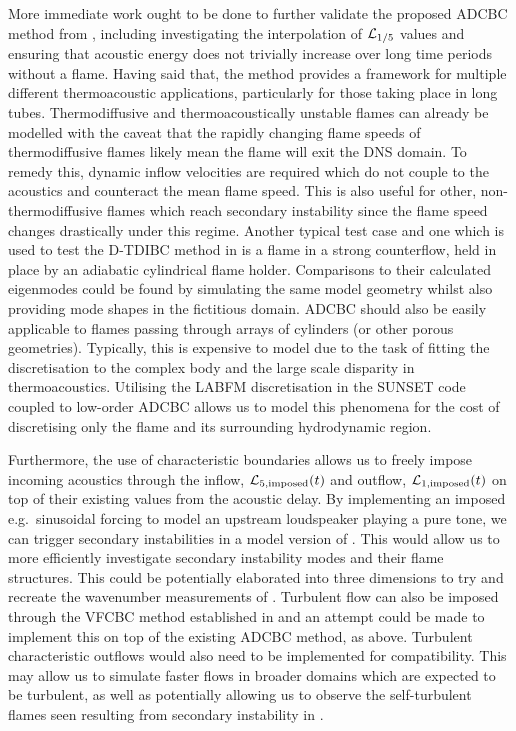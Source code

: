 More immediate work ought to be done to further validate the proposed ADCBC method from , including investigating the interpolation of $\mathcal{L}_{1/5}$ values and ensuring that acoustic energy does not trivially increase over long time periods without a flame. Having said that, the method provides a framework for multiple different thermoacoustic applications, particularly for those taking place in long tubes. Thermodiffusive and thermoacoustically unstable flames can already be modelled with the caveat that the rapidly changing flame speeds of thermodiffusive flames likely mean the flame will exit the DNS domain. To remedy this, dynamic inflow velocities are required which do not couple to the acoustics and counteract the mean flame speed. This is also useful for other, non-thermodiffusive flames which reach secondary instability since the flame speed changes drastically under this regime. Another typical test case and one which is used to test the D-TDIBC method in \cite{douasbin2018DelayedtimeDomainImpedance} is a flame in a strong counterflow, held in place by an adiabatic cylindrical flame holder. Comparisons to their calculated eigenmodes could be found by simulating the same model geometry whilst also providing mode shapes in the fictitious domain. ADCBC should also be easily applicable to flames passing through arrays of cylinders (or other porous geometries). Typically, this is expensive to model due to the task of fitting the discretisation to the complex body and the large scale disparity in thermoacoustics. Utilising the LABFM discretisation in the SUNSET code coupled to low-order ADCBC allows us to model this phenomena for the cost of discretising only the flame and its surrounding hydrodynamic region.

Furthermore, the use of characteristic boundaries allows us to freely impose incoming acoustics through the inflow, $\mathcal{L}_{5, \mathrm{imposed}}(t)$ and outflow, $\mathcal{L}_{1, \mathrm{imposed}}(t)$ on top of their existing values from the acoustic delay. By implementing an imposed e.g.\ sinusoidal forcing to model an upstream loudspeaker playing a pure tone, we can trigger secondary instabilities in a model version of \cite{searby1991ParametricAcousticInstability}. This would allow us to more efficiently investigate secondary instability modes and their flame structures. This could be potentially elaborated into three dimensions to try and recreate the wavenumber measurements of \cite{delfin2024DeterminationMethodMarkstein}. Turbulent flow can also be imposed through the VFCBC method established in \cite{guezennec2009AcousticallyNonreflectingReflecting} and an attempt could be made to implement this on top of the existing ADCBC method, as above. Turbulent characteristic outflows would also need to be implemented for compatibility. This may allow us to simulate faster flows in broader domains which are expected to be turbulent, as well as potentially allowing us to observe the self-turbulent flames seen resulting from secondary instability in \cite{searby1992AcousticInstabilityPremixed}.

